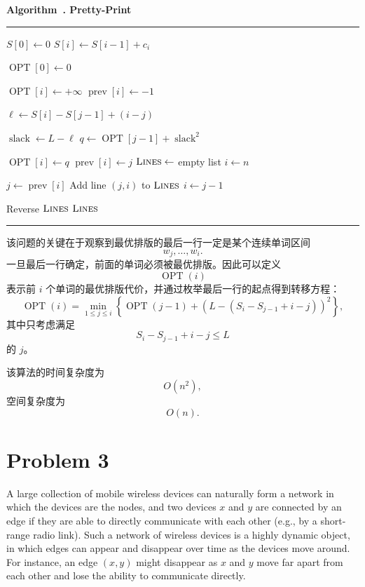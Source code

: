 \documentclass[12pt,a4paper]{article}
\newenvironment{breakablealgorithm}[1]{%
  \par\addvspace{1em}
  \refstepcounter{algorithm}%
  \noindent\textbf{Algorithm~\thealgorithm. #1}\par\nobreak
  \noindent\rule{\linewidth}{0.4pt}\par\nobreak
  \vspace{0.4em}
}{%
  \par\vspace{0.2em}
  \noindent\rule{\linewidth}{0.4pt}
  \par\addvspace{1em}
}
\begin{document}
\begin{answerbox}
\begin{breakablealgorithm}{Pretty-Print}
\begin{algorithmic}[1]
\State $S[0]\gets 0$
    \State $S[i]\gets S[i-1]+c_i$
\EndFor

\State $\operatorname{OPT}[0]\gets 0$

    \State $\operatorname{OPT}[i]\gets +\infty$
    \State $\operatorname{prev}[i]\gets -1$

        \State $\ell \gets S[i]-S[j-1]+(i-j)$

            \State $\operatorname{slack}\gets L-\ell$
            \State $q\gets \operatorname{OPT}[j-1]+\operatorname{slack}^2$

                \State $\operatorname{OPT}[i]\gets q$
                \State $\operatorname{prev}[i]\gets j$
            \EndIf
        \EndIf
    \EndFor
\EndFor
\State $\textsc{Lines}\gets$ empty list
\State $i\gets n$

    \State $j\gets \operatorname{prev}[i]$
    \State Add line $(j,i)$ to $\textsc{Lines}$
    \State $i\gets j-1$
\EndWhile

\State Reverse $\textsc{Lines}$
\State \Return $\textsc{Lines}$

\end{algorithmic}
\end{breakablealgorithm}


该问题的关键在于观察到最优排版的最后一行一定是某个连续单词区间
\[
w_j,\ldots,w_i.
\]
一旦最后一行确定，前面的单词必须被最优排版。因此可以定义
\[
\operatorname{OPT}(i)
\]
表示前 $i$ 个单词的最优排版代价，并通过枚举最后一行的起点得到转移方程：
\[
\operatorname{OPT}(i)
=
\min_{1\le j\le i}
\left\{
\operatorname{OPT}(j-1)
+
\left(
L-\left(S_i-S_{j-1}+i-j\right)
\right)^2
\right\},
\]
其中只考虑满足
\[
S_i-S_{j-1}+i-j\le L
\]
的 $j$。

该算法的时间复杂度为
\[
O(n^2),
\]
空间复杂度为
\[
O(n).
\]

\end{answerbox}

\section{Problem 3}

A large collection of mobile wireless devices can naturally form a network in which the devices are the nodes, and two devices $x$ and $y$ are connected by an edge if they are able to directly communicate with each other (e.g., by a short-range radio link). Such a network of wireless devices is a highly dynamic object, in which edges can appear and disappear over time as the devices move around. For instance, an edge $(x,y)$ might disappear as $x$ and $y$ move far apart from each other and lose the ability to communicate directly.
\end{document}
